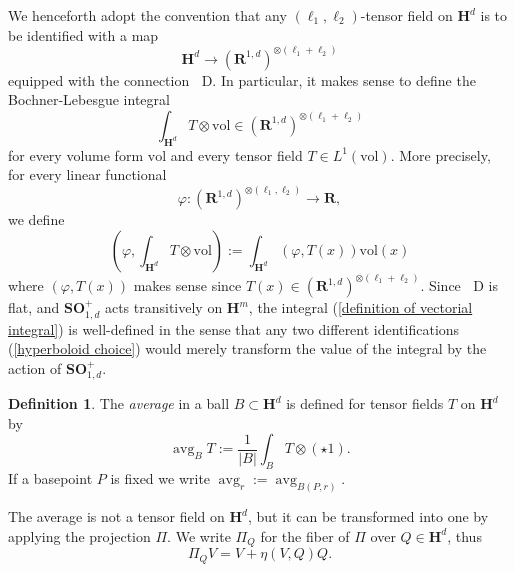 \documentclass[reqno,12pt,letterpaper]{amsart}
\newcommand{\RR}{\mathbf{R}}
\newcommand{\Hyp}{\mathbf H}
\newcommand{\SpOrth}{\mathbf{SO}}
\DeclareMathOperator{\avg}{avg}
\newcommand*\Dif{\mathop{}\!\mathrm{D}}
\newcommand{\vol}{\mathrm{vol}}
\newcommand{\dfn}[1]{\emph{#1}\index{#1}}
\theoremstyle{definition}
\newtheorem{definition}[theorem]{Definition}
\numberwithin{equation}{section}
\begin{document}
We henceforth adopt the convention that any $(\ell_1, \ell_2)$-tensor field on $\Hyp^d$ is to be identified with a map
$$\Hyp^d \to (\RR^{1, d})^{\otimes(\ell_1 + \ell_2)}$$
equipped with the connection $\Dif$.
In particular, it makes sense to define the Bochner-Lebesgue integral
\begin{equation}\label{definition of vectorial integral}
\int_{\Hyp^d} T \otimes \vol \in (\RR^{1, d})^{\otimes (\ell_1 + \ell_2)}
\end{equation}
for every volume form $\vol$ and every tensor field $T \in L^1(\vol)$. More precisely, for every linear functional
$$\varphi: (\RR^{1, d})^{\otimes(\ell_1, \ell_2)} \to \RR,$$
we define
$$\left(\varphi, \int_{\Hyp^d} T \otimes \vol\right) := \int_{\Hyp^d} (\varphi, T(x)) \vol(x)$$
where $(\varphi, T(x))$ makes sense since $T(x) \in (\RR^{1, d})^{\otimes (\ell_1 + \ell_2)}$.
Since $\Dif$ is flat, and  $\SpOrth^+_{1, d}$ acts transitively on $\Hyp^m$, the integral (\ref{definition of vectorial integral}) is well-defined in the sense that any two different identifications (\ref{hyperboloid choice}) would merely transform the value of the integral by the action of $\SpOrth^+_{1, d}$.

\begin{definition}
The \dfn{average} in a ball $B \subset \Hyp^d$ is defined for tensor fields $T$ on $\Hyp^d$ by
$$\avg_B T := \frac{1}{|B|} \int_B T \otimes (\star 1).$$
If a basepoint $P$ is fixed we write $\avg_r := \avg_{B(P, r)}$.
\end{definition}

The average is not a tensor field on $\Hyp^d$, but it can be transformed into one by applying the projection $\Pi$.
We write $\Pi_Q$ for the fiber of $\Pi$ over $Q \in \Hyp^d$, thus
\begin{equation}\label{projection formula}
\Pi_Q V = V + \eta(V, Q)Q.
\end{equation}

\end{document}
